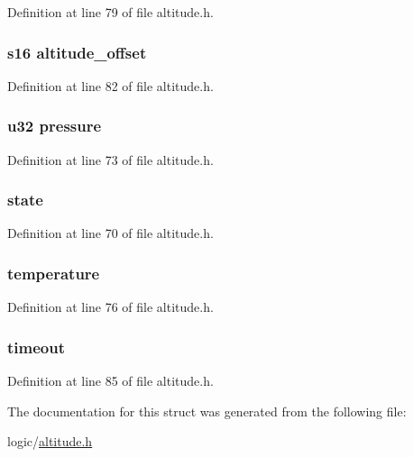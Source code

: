 \-Definition at line 79 of file altitude.\-h.

\hypertarget{structalt_aef78b8fb382f9cd58ccbec4471101398}{
\subsubsection[{altitude\-\_\-offset}]{\setlength{\rightskip}{0pt plus 5cm}s16 {\bf altitude\-\_\-offset}}}\label{structalt_aef78b8fb382f9cd58ccbec4471101398}


\-Definition at line 82 of file altitude.\-h.

\hypertarget{structalt_a3dd5bcc30ce1408a2e33442767ef6971}{
\subsubsection[{pressure}]{\setlength{\rightskip}{0pt plus 5cm}u32 {\bf pressure}}}\label{structalt_a3dd5bcc30ce1408a2e33442767ef6971}


\-Definition at line 73 of file altitude.\-h.

\hypertarget{structalt_ac6b2518df4ca45cee089e61f152572b2}{
\subsubsection[{state}]{ {\bf state}}}\label{structalt_ac6b2518df4ca45cee089e61f152572b2}


\-Definition at line 70 of file altitude.\-h.

\hypertarget{structalt_a157379ac5ab58014f162220393ace12d}{
\subsubsection[{temperature}]{ {\bf temperature}}}\label{structalt_a157379ac5ab58014f162220393ace12d}


\-Definition at line 76 of file altitude.\-h.

\hypertarget{structalt_a735bf6536b07682f96c9417b0f1e9079}{
\subsubsection[{timeout}]{ {\bf timeout}}}\label{structalt_a735bf6536b07682f96c9417b0f1e9079}


\-Definition at line 85 of file altitude.\-h.



\-The documentation for this struct was generated from the following file\-:\begin{DoxyCompactItemize}
\item 
logic/\hyperlink{altitude_8h}{altitude.\-h}\end{DoxyCompactItemize}
